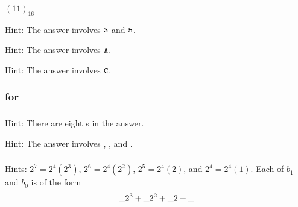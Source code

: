 \subsubsection*{ \answers}
\begin{apart}
    \item $(11)_{16}$
    \item Hint: The answer involves $\texttt{3}$ and $\texttt{5}$.
    \item Hint: The answer involves $\texttt{A}$.
    \item Hint: The answer involves $\texttt{C}$.
\end{apart}

\subsubsection{\answers for  \subhexforbinary}

\subsubsection*{ \answers}
\begin{apart}
    \item Hint: There are eight s in the answer.
    \item Hint: The answer involves , , and .
\end{apart}

\subsubsection*{ \answers}
Hints: $2^7=2^4(2^3)$, $2^6=2^4(2^2)$, $2^5=2^4(2)$, and $2^4=2^4(1)$.  Each of $b_1$ and $b_0$ is of the form     $$\underline{\hspace{.1in}}2^3+ \underline{\hspace{.1in}}2^2+
\underline{\hspace{.1in}}2+
\underline{\hspace{.1in}}$$








